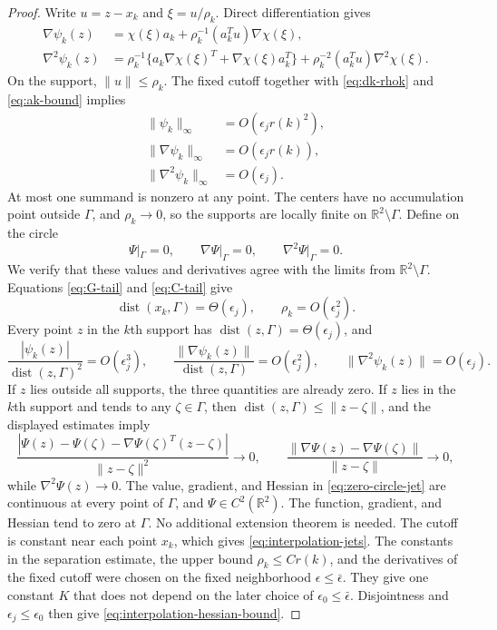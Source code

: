 \documentclass[11pt]{article}
\newcommand{\R}{\mathbb R}
\newcommand{\norm}[1]{\lVert #1\rVert}
\begin{document}
\begin{proof}
Write $u=z-x_k$ and $\xi=u/\rho_k$.  Direct differentiation gives
\begin{align*}
\nabla\psi_k(z)
&=\chi(\xi)a_k
+\rho_k^{-1}(a_k^Tu)\nabla\chi(\xi),\\
\nabla^2\psi_k(z)
&=\rho_k^{-1}\{a_k\nabla\chi(\xi)^T
+\nabla\chi(\xi)a_k^T\}
+\rho_k^{-2}(a_k^Tu)\nabla^2\chi(\xi).
\end{align*}
On the support, $\|u\|\le\rho_k$.  The fixed cutoff together with
\eqref{eq:dk-rhok} and \eqref{eq:ak-bound} implies
\begin{align*}
\|\psi_k\|_\infty&=O(\epsilon_jr(k)^2),\\
\|\nabla\psi_k\|_\infty&=O(\epsilon_jr(k)),\\
\|\nabla^2\psi_k\|_\infty&=O(\epsilon_j).
\end{align*}
At most one summand is nonzero at any point.  The centers have no accumulation
point outside $\Gamma$, and $\rho_k\to0$, so the supports are locally finite on
$\R^2\setminus\Gamma$.  Define on the circle
\begin{equation}\label{eq:zero-circle-jet}
\Psi|_\Gamma=0,\qquad
\nabla\Psi|_\Gamma=0,\qquad
\nabla^2\Psi|_\Gamma=0.
\end{equation}
We verify that these values and derivatives agree with the limits from
$\R^2\setminus\Gamma$.  Equations
\eqref{eq:G-tail} and \eqref{eq:C-tail} give
\[
\operatorname{dist}(x_k,\Gamma)=\Theta(\epsilon_j),
\qquad \rho_k=O(\epsilon_j^2).
\]
Every point $z$ in the $k$th support has
$\operatorname{dist}(z,\Gamma)=\Theta(\epsilon_j)$, and
\[
\frac{|\psi_k(z)|}{\operatorname{dist}(z,\Gamma)^2}=O(\epsilon_j^3),
\qquad
\frac{\|\nabla\psi_k(z)\|}{\operatorname{dist}(z,\Gamma)}
=O(\epsilon_j^2),
\qquad
\|\nabla^2\psi_k(z)\|=O(\epsilon_j).
\]
If $z$ lies outside all supports, the three quantities are already zero.  If
$z$ lies in the $k$th support and tends to any $\zeta\in\Gamma$, then
$\operatorname{dist}(z,\Gamma)\le\norm{z-\zeta}$, and the displayed estimates
imply
\[
\frac{|\Psi(z)-\Psi(\zeta)-\nabla\Psi(\zeta)^T(z-\zeta)|}
     {\norm{z-\zeta}^2}\longrightarrow0,
\qquad
\frac{\norm{\nabla\Psi(z)-\nabla\Psi(\zeta)}}
     {\norm{z-\zeta}}\longrightarrow0,
\]
while $\nabla^2\Psi(z)\to0$.  The value, gradient, and Hessian in
\eqref{eq:zero-circle-jet} are continuous at every point of $\Gamma$, and
$\Psi\in C^2(\R^2)$.  The function, gradient, and Hessian tend to zero at
$\Gamma$.  No additional extension theorem is needed.
The cutoff is constant near each point $x_k$, which gives
\eqref{eq:interpolation-jets}.  The constants in the separation estimate, the upper
bound $\rho_k\le Cr(k)$, and the derivatives of the fixed cutoff were chosen
on the fixed neighborhood $\epsilon\le\bar\epsilon$.  They give one constant
$K$ that does not depend on the later choice of
$\epsilon_0\le\bar\epsilon$.  Disjointness and
$\epsilon_j\le\epsilon_0$ then give
\eqref{eq:interpolation-hessian-bound}.
\end{proof}
\end{document}
